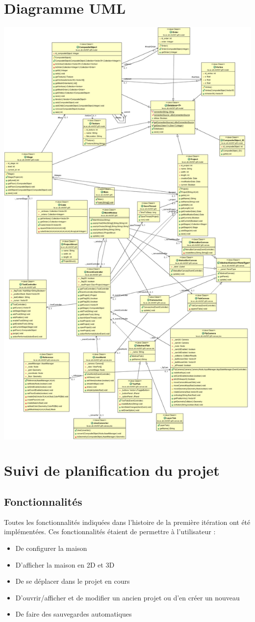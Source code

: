 \documentclass[a4paper, 12pt]{report}
\begin{document}
   		\section{Diagramme UML}
   			\includegraphics[scale=0.2]{images/uml.png}
		\section{Suivi de planification du projet}
			\subsection{Fonctionnalités}
				Toutes les fonctionnalités indiquées dans l'histoire de la première itération ont été implémentées. Ces fonctionnalités étaient de permettre à l'utilisateur : 
				\begin{itemize}
					\item De configurer la maison
					\item D'afficher la maison en 2D et 3D
					\item De se déplacer dans le projet en cours
					\item D'ouvrir/afficher et de modifier un ancien projet ou d'en créer un nouveau
					\item De faire des sauvegardes automatiques
				\end{itemize}
				
\end{document}
